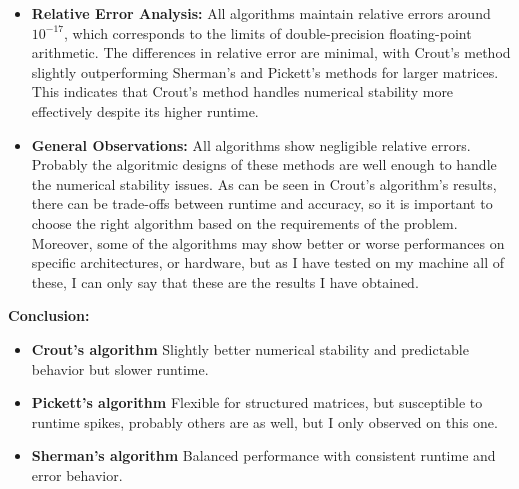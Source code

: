 \documentclass[11pt,a4paper, margin=1in]{article}
\begin{document}
\begin{enumerate}
\begin{itemize}
        \item \textbf{Relative Error Analysis:}
        All algorithms maintain relative errors around \( 10^{-17} \), which corresponds to the limits of double-precision floating-point arithmetic. The differences in relative error are minimal, with Crout's method slightly outperforming Sherman's and Pickett's methods for larger matrices. This indicates that Crout's method handles numerical stability more effectively despite its higher runtime.

        \item \textbf{General Observations:}
        All algorithms show negligible relative errors. Probably the algoritmic designs of these methods are well enough to handle the numerical stability issues. As can be seen in Crout's algorithm's results, there can be trade-offs between runtime and accuracy, so it is important to choose the right algorithm based on the requirements of the problem. Moreover, some of the algorithms may show better or worse performances on specific architectures, or hardware, but as I have tested on my machine all of these, I can only say that these are the results I have obtained.
    \end{itemize}

    \textbf{Conclusion:} 
    \begin{itemize}
        \item \textbf{Crout's algorithm} Slightly better numerical stability and predictable behavior but slower runtime.
        \item \textbf{Pickett's algorithm} Flexible for structured matrices, but susceptible to runtime spikes, probably others are as well, but I only observed on this one.
        \item \textbf{Sherman's algorithm} Balanced performance with consistent runtime and error behavior.
    \end{itemize}

\end{enumerate}
\end{document}
